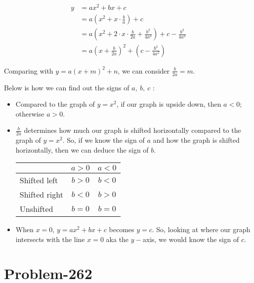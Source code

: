 \documentclass[12pt]{article}
\begin{document}
\begin{equation*}
	\begin{aligned}
		y &= ax^2 + bx + c\\
		  &= a\left( x^2 + x\cdot \frac{b}{a} \right) + c\\
		  &= a\left( x^2 + 2 \cdot x \cdot \frac{b}{2a} + \frac{b^2}{4a^2} \right) + c - \frac{b^2}{4a^2}\\
		  &= a \left( x+\frac{b}{2a} \right)^2 + \left( c - \frac{b^2}{4a^2} \right)
	\end{aligned}
\end{equation*}

Comparing with $y = a(x+m)^2 + n$, we can consider $\frac{b}{2a} = m$.

Below is how we can find out the signs of $a,\ b,\ c$ :
\begin{itemize}
	\item Compared to the graph of $y = x^2$, if our graph is upside down, then $a < 0$; otherwise $a > 0$.
	\item $\frac{b}{2a}$ determines how much our graph is shifted horizontally compared to the graph of $y = x^2$. So, if we know the sign of $a$ and how the graph is shifted horizontally, then we can deduce the sign of $b$. 
	
\begin{table}[ht]
\centering %
\begin{tabular}{| l | c | c |} %
\hline %
 & $a > 0$ & $a < 0$ \\ %
\hline %
Shifted left  & $b > 0$ & $b < 0$ \\
Shifted right & $b < 0$ & $b > 0$ \\
Unshifted     & $b = 0$ & $b = 0$ \\
\hline %
\end{tabular}
\label{table:nonlin} %
\end{table}

	\item When $x = 0$, $y = ax^2 + bx + c$ becomes $y = c$. So, looking at where our graph intersects with the line $x = 0$ aka the $y-$axis, we would know the sign of $c$.
\end{itemize}

\section*{Problem-262}
\end{document}
